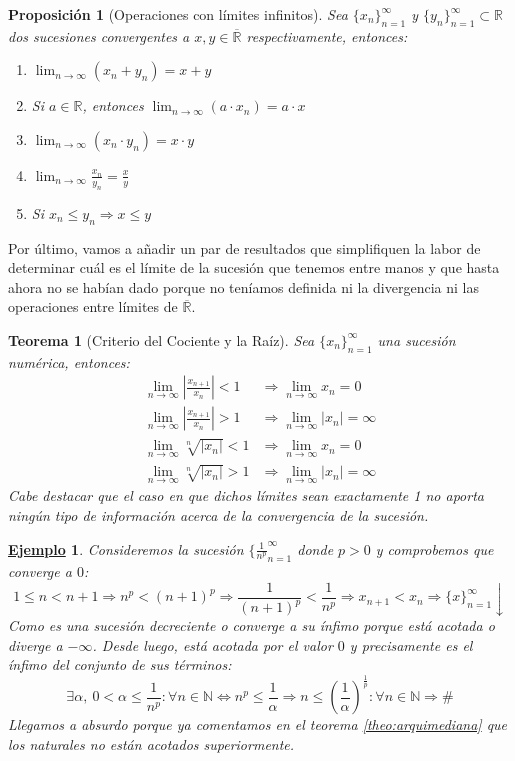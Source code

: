 \documentclass[10pt,a4paper,openright]{book}
\theoremstyle{break}
\newtheorem{theo}{Teorema}[chapter]
\newtheorem{prop}{Proposición}[chapter]
\newtheorem{ej}{\underline{Ejemplo}}[chapter]
\begin{document}
\begin{prop}[Operaciones con límites infinitos]
Sea $\{x_n\}_{n=1}^\infty$ y $\{y_n\}_{n=1}^\infty\subset \mathbb R$ dos sucesiones convergentes a $x,y\in \overline{\mathbb R}$ respectivamente, entonces:
\begin{enumerate}
\item $\lim_{n\rightarrow \infty}(x_n+y_n)=x+y$
\item Si $a\in \mathbb R$, entonces $\lim_{n\rightarrow \infty} (a\cdot x_n)=a\cdot x$
\item $\lim_{n\rightarrow \infty}(x_n\cdot y_n)=x\cdot y$
\item $\lim_{n\rightarrow \infty}\frac{x_n}{y_n}=\frac{x}{y}$
\item Si $x_n\leq y_n \Rightarrow x\leq y$
\end{enumerate}
\end{prop}

Por último, vamos a añadir un par de resultados que simplifiquen la labor de determinar cuál es el límite de la sucesión que tenemos entre manos y que hasta ahora no se habían dado porque no teníamos definida ni la divergencia ni las operaciones entre límites de $\overline{\mathbb{R}}$.

\begin{theo}[Criterio del Cociente y la Raíz]
Sea $\{x_n\}_{n=1}^\infty$ una sucesión numérica, entonces:
\begin{align*}
\lim_{n\rightarrow \infty}\left|\frac{x_{n+1}}{x_n}\right|<1 &\Rightarrow \lim_{n\rightarrow \infty} x_n=0 \\
\lim_{n\rightarrow \infty}\left|\frac{x_{n+1}}{x_n}\right|>1 &\Rightarrow \lim_{n\rightarrow \infty} |x_n|=\infty \\
\lim_{n\rightarrow \infty}\sqrt[n]{|x_n|}<1 &\Rightarrow \lim_{n\rightarrow \infty} x_n=0\\
\lim_{n\rightarrow \infty}\sqrt[n]{|x_n|}>1 &\Rightarrow \lim_{n\rightarrow \infty} |x_n|=\infty
\end{align*}
Cabe destacar que el caso en que dichos límites sean exactamente 1 no aporta ningún tipo de información acerca de la convergencia de la sucesión.
\end{theo}


\begin{ej}
Consideremos la sucesión $\{\frac{1}{n^p}_{n=1}^\infty$ donde $p>0$ y comprobemos que converge a $0$:
\[
1\leq n<n+1\Rightarrow n^p < (n+1)^p \Rightarrow \frac{1}{(n+1)^p} < \frac{1}{n^p} \Rightarrow x_{n+1} < x_n \Rightarrow \{x\}_{n=1}^\infty \downarrow
\]
Como es una sucesión decreciente o converge a su ínfimo porque está acotada o diverge a $-\infty$. Desde luego, está acotada por el valor $0$ y precisamente es el ínfimo del conjunto de sus términos:
$$\exists \alpha, \ 0 < \alpha \leq \frac{1}{n^p}: \forall n\in \mathbb N \Leftrightarrow n^p\leq \frac{1}{\alpha}\Rightarrow n\leq \left(\frac{1}{\alpha}\right)^{\frac{1}{p}}: \forall n \in \mathbb N\Rightarrow \#$$
Llegamos a absurdo porque ya comentamos en el teorema \ref{theo:arquimediana} que los naturales no están acotados superiormente.
\end{ej}
\end{document}

